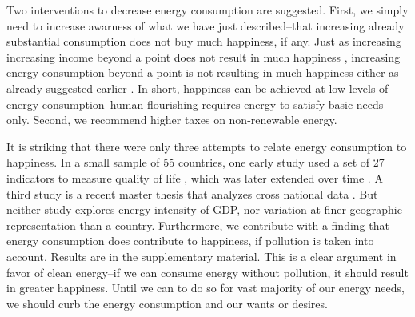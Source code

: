 \documentclass[10pt, letterpaper]{article}
\begin{document}
\begin{spacing}{1.4}
Two interventions to decrease energy consumption are suggested. First, we simply
need to increase awarness of what we have just described--that increasing
already substantial consumption does not buy much happiness, if any. Just as increasing increasing income
 beyond a point does not result in much happiness \cite{kahneman10}, increasing energy consumption beyond a point is not resulting in much happiness
 either as already suggested earlier \cite{mazur74, mazur11}. In short, happiness can be achieved at low
 levels of energy consumption--human flourishing requires energy to satisfy
 basic needs only. Second, we recommend higher taxes on non-renewable energy. 

It is striking that there were only three  attempts to
relate energy consumption to happiness.   %
 In a small sample of 55 countries, one early study used a set of 27 indicators to measure
 quality of life \cite{mazur74}, which was later extended over time \cite{mazur11}.
 A third study is a recent master
 thesis that  analyzes cross national data \cite{winfrey13}. But neither
 study  explores energy intensity of GDP, nor variation at finer geographic representation than a country.
Furthermore, we contribute with a finding that energy consumption does contribute to happiness, if pollution is
taken into account. Results are in the supplementary material. This is a clear argument in favor of clean energy--if we can
consume energy without pollution, it should result in greater happiness. Until
we can to do so for vast majority of our energy needs, we should curb the energy consumption and
our wants or desires.




\end{spacing}
\end{document}
